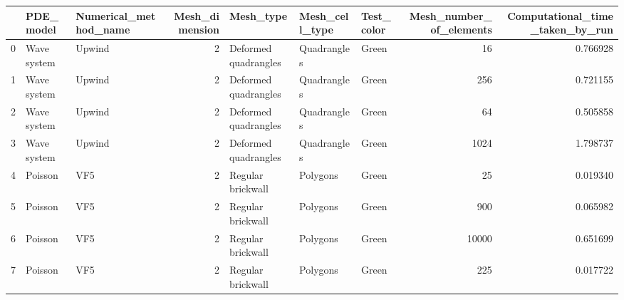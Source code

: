 \begin{tabular}{lllrlllrr}
\toprule
{} &         PDE\_model &          Numerical\_method\_name &  Mesh\_dimension &                                 Mesh\_type &          Mesh\_cell\_type &                           Test\_color &  Mesh\_number\_of\_elements &  Computational\_time\_taken\_by\_run \\
\midrule
0   &       Wave system &                         Upwind &               2 &                      Deformed quadrangles &            Quadrangles  &                                Green &                       16 &                         0.766928 \\
1   &       Wave system &                         Upwind &               2 &                      Deformed quadrangles &            Quadrangles  &                                Green &                      256 &                         0.721155 \\
2   &       Wave system &                         Upwind &               2 &                      Deformed quadrangles &            Quadrangles  &                                Green &                       64 &                         0.505858 \\
3   &       Wave system &                         Upwind &               2 &                      Deformed quadrangles &            Quadrangles  &                                Green &                     1024 &                         1.798737 \\
4   &           Poisson &                            VF5 &               2 &                         Regular brickwall &               Polygons  &                                Green &                       25 &                         0.019340 \\
5   &           Poisson &                            VF5 &               2 &                         Regular brickwall &               Polygons  &                                Green &                      900 &                         0.065982 \\
6   &           Poisson &                            VF5 &               2 &                         Regular brickwall &               Polygons  &                                Green &                    10000 &                         0.651699 \\
7   &           Poisson &                            VF5 &               2 &                         Regular brickwall &               Polygons  &                                Green &                      225 &                         0.017722 \\

\end{tabular}
